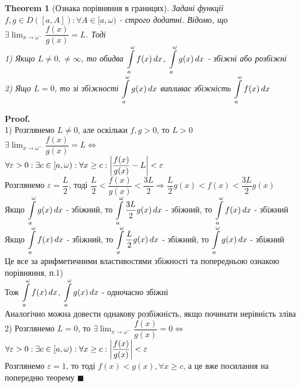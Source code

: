 \documentclass[a4paper, 14pt]{extarticle}
\def\huge{\displaystyle}
\def\bigline{\vspace{5mm}\\}
\theoremstyle{theoremdd}
\newtheorem{theorem}{Theorem}[subsection]
\theoremstyle{theoremdd}
\theoremstyle{theoremdd}
\theoremstyle{theoremdd}
\theoremstyle{theoremdd}
\theoremstyle{theoremdd}
\theoremstyle{theoremdd}
\theoremstyle{theoremdd}
\newenvironment{pf}{\vspace*{-3mm} \textbf{Proof. \\}}{$\blacksquare$}
\begin{document}
\begin{theorem}[Ознака порівняння в границях]
Задані функції $f,g \in D([a,A]): \forall A \in [a,\omega)$ - строго додатні. Відомо, що\\
$\exists \huge \lim_{x \to \omega^-} \dfrac{f(x)}{g(x)} = L$. Тоді\\
1) Якщо $L \neq 0, \neq \infty$, то обидва $\huge\int\displaylimits_a^\omega f(x)\,dx$, $\huge\int\displaylimits_a^\omega g(x)\,dx$ - збіжні або розбіжні\\
2) Ящо $L = 0$, то зі збіжності $\huge\int\displaylimits_a^\omega g(x)\,dx$ випливає збіжність $\huge\int\displaylimits_a^\omega f(x)\,dx$
\end{theorem}
\begin{pf}
1) Розглянемо $L \neq 0$, але оскільки $f,g > 0$, то $L>0$\\
$\exists \huge \lim_{x \to \omega^-} \dfrac{f(x)}{g(x)} = L \iff$\\
$\forall \varepsilon > 0: \exists c \in [a,\omega): \forall x \geq c: \abs{\dfrac{f(x)}{g(x)} - L} < \varepsilon$\\
Розглянемо $\varepsilon = \dfrac{L}{2}$, тоді $\dfrac{L}{2} < \dfrac{f(x)}{g(x)} < \dfrac{3L}{2} \Rightarrow \dfrac{L}{2}g(x) < f(x) < \dfrac{3L}{2}g(x)$\\
Якщо $\huge\int\displaylimits_a^\omega g(x)\,dx$ - збіжний, то $\huge\int\displaylimits_a^\omega \dfrac{3L}{2} g(x)\,dx$ - збіжний, то $\huge\int\displaylimits_a^\omega f(x)\,dx$ - збіжний\\
Якщо $\huge\int\displaylimits_a^\omega f(x)\,dx$ - збіжний, то $\huge\int\displaylimits_a^\omega \dfrac{L}{2} g(x)\,dx$ - збіжний, то $\huge\int\displaylimits_a^\omega g(x)\,dx$ - збіжний\\
Це все за арифметичними властивостями збіжності та попередньою ознакою порівняння, п.1)\\
Тож $\huge\int\displaylimits_a^\omega f(x)\,dx$, $\huge\int\displaylimits_a^\omega g(x)\,dx$ - одночасно збіжні\\
Аналогічно можна довести однакову розбіжність, якщо починати нерівність зліва
\bigline
2) Розглянемо $L = 0$, то $\exists \huge \lim_{x \to \omega^-} \dfrac{f(x)}{g(x)} = 0 \iff$\\
$\forall \varepsilon > 0: \exists c \in [a,\omega): \forall x \geq c: \abs{\dfrac{f(x)}{g(x)}} < \varepsilon$\\
Розглянемо $\varepsilon = 1$, то тоді $f(x) < g(x), \forall x \geq c$, а це вже посилання на попередню теорему
\end{pf}
\end{document}
